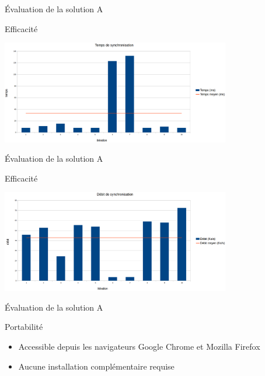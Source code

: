 \author{Jérémy \textsc{Guillon}}
\begin{frame}{\'Evaluation de la solution A}
	\begin{block}{Efficacité}
		\begin{center}
			\includegraphics[width=10cm]{images/tempsA.png}
		\end{center}
	\end{block}
\end{frame}

\begin{frame}{\'Evaluation de la solution A}
	\begin{block}{Efficacité}
		\begin{center}
			\includegraphics[width=10cm]{images/debitA.png}
		\end{center}
	\end{block}
\end{frame}

\begin{frame}{\'Evaluation de la solution A}
	\begin{block}{Portabilité}
		\begin{itemize}
			\item Accessible depuis les navigateurs Google Chrome et Mozilla Firefox
			\item Aucune installation complémentaire requise
		\end{itemize}
	\end{block}
\end{frame}

